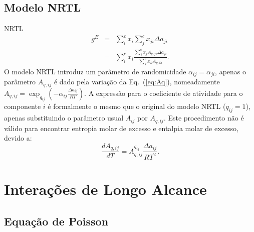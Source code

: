 \documentclass{beamer}
\begin{document}
\subsection{Modelo NRTL}
\begin{frame}{NRTL}
\begin{eqnarray}
\label{eq:ge-nrtl} 
 g^E &=& \sum_i^c x_i \sum_j^c x_{ji} \Delta a_{ji} \nonumber \\
     &=& \sum_i^c x_i \frac{\sum_j^c x_j A_{q,ji} \Delta a_{ji}}
                           {\sum_k^c x_k A_{q,ki}}.
\end{eqnarray}
%
O modelo NRTL introduz um parâmetro de randomicidade 
 $\alpha_{ij}=\alpha_{ji}$,
apenas o parâmetro $A_{q,ij}$ é dado pela variação da Eq.~(\ref{eq:Aq}), 
nomeadamente 
$ A_{q,ij} = \exp_{q_{ij}}(-\alpha_{ij}\frac{\Delta a_{ij}}{RT})$.
%
A expressão para o coeficiente de atividade para o componente $i$ é 
formalmente o mesmo que o original do modelo NRTL ($q_{ij}=1$), 
apenas substituindo o parâmetro usual $A_{ij}$ por $A_{q,ij}$.
Este procedimento não é válido para encontrar entropia molar de excesso e
entalpia molar de excesso, devido a:  %
%
\begin{equation}
\label{eq:dAqdT}
 \frac{dA_{q,ij}}{dT}= A_{q,ij}^{q_{ij}} \frac{\Delta a_{ij}}{RT^2}.
\end{equation}
\end{frame}



\section{Interações de Longo Alcance}

\subsection{Equação de Poisson}
\end{document}
